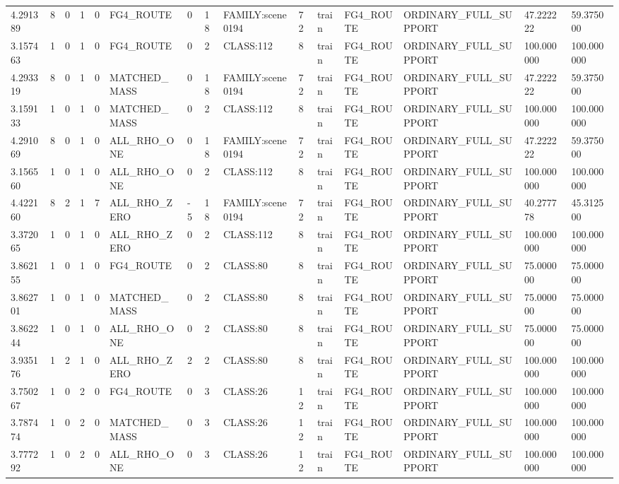 \begin{tabular}{lllllllllllllll}
4.291389 & 8 & 0 & 1 & 0 & FG4\_ROUTE & 0 & 18 & FAMILY:scene0194 & 72 & train & FG4\_ROUTE & ORDINARY\_FULL\_SUPPORT & 47.222222 & 59.375000 \\
3.157463 & 1 & 0 & 1 & 0 & FG4\_ROUTE & 0 & 2 & CLASS:112 & 8 & train & FG4\_ROUTE & ORDINARY\_FULL\_SUPPORT & 100.000000 & 100.000000 \\
4.293319 & 8 & 0 & 1 & 0 & MATCHED\_MASS & 0 & 18 & FAMILY:scene0194 & 72 & train & FG4\_ROUTE & ORDINARY\_FULL\_SUPPORT & 47.222222 & 59.375000 \\
3.159133 & 1 & 0 & 1 & 0 & MATCHED\_MASS & 0 & 2 & CLASS:112 & 8 & train & FG4\_ROUTE & ORDINARY\_FULL\_SUPPORT & 100.000000 & 100.000000 \\
4.291069 & 8 & 0 & 1 & 0 & ALL\_RHO\_ONE & 0 & 18 & FAMILY:scene0194 & 72 & train & FG4\_ROUTE & ORDINARY\_FULL\_SUPPORT & 47.222222 & 59.375000 \\
3.156560 & 1 & 0 & 1 & 0 & ALL\_RHO\_ONE & 0 & 2 & CLASS:112 & 8 & train & FG4\_ROUTE & ORDINARY\_FULL\_SUPPORT & 100.000000 & 100.000000 \\
4.422160 & 8 & 2 & 1 & 7 & ALL\_RHO\_ZERO & -5 & 18 & FAMILY:scene0194 & 72 & train & FG4\_ROUTE & ORDINARY\_FULL\_SUPPORT & 40.277778 & 45.312500 \\
3.372065 & 1 & 0 & 1 & 0 & ALL\_RHO\_ZERO & 0 & 2 & CLASS:112 & 8 & train & FG4\_ROUTE & ORDINARY\_FULL\_SUPPORT & 100.000000 & 100.000000 \\
3.862155 & 1 & 0 & 1 & 0 & FG4\_ROUTE & 0 & 2 & CLASS:80 & 8 & train & FG4\_ROUTE & ORDINARY\_FULL\_SUPPORT & 75.000000 & 75.000000 \\
3.862701 & 1 & 0 & 1 & 0 & MATCHED\_MASS & 0 & 2 & CLASS:80 & 8 & train & FG4\_ROUTE & ORDINARY\_FULL\_SUPPORT & 75.000000 & 75.000000 \\
3.862244 & 1 & 0 & 1 & 0 & ALL\_RHO\_ONE & 0 & 2 & CLASS:80 & 8 & train & FG4\_ROUTE & ORDINARY\_FULL\_SUPPORT & 75.000000 & 75.000000 \\
3.935176 & 1 & 2 & 1 & 0 & ALL\_RHO\_ZERO & 2 & 2 & CLASS:80 & 8 & train & FG4\_ROUTE & ORDINARY\_FULL\_SUPPORT & 100.000000 & 100.000000 \\
3.750267 & 1 & 0 & 2 & 0 & FG4\_ROUTE & 0 & 3 & CLASS:26 & 12 & train & FG4\_ROUTE & ORDINARY\_FULL\_SUPPORT & 100.000000 & 100.000000 \\
3.787474 & 1 & 0 & 2 & 0 & MATCHED\_MASS & 0 & 3 & CLASS:26 & 12 & train & FG4\_ROUTE & ORDINARY\_FULL\_SUPPORT & 100.000000 & 100.000000 \\
3.777292 & 1 & 0 & 2 & 0 & ALL\_RHO\_ONE & 0 & 3 & CLASS:26 & 12 & train & FG4\_ROUTE & ORDINARY\_FULL\_SUPPORT & 100.000000 & 100.000000 \\

\end{tabular}
